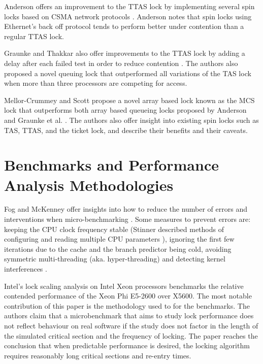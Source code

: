 Anderson offers an improvement to the TTAS lock by implementing several spin locks based on CSMA network protocols \cite{anderson1990performance}. Anderson notes that spin locks using Ethernet's back off protocol tends to perform better under contention than a regular TTAS lock.

Graunke and Thakkar also offer improvements to the TTAS lock by adding a delay after each failed test in order to reduce contention \cite{graunke1990synchronization}. The authors also proposed a novel queuing lock that outperformed all variations of the TAS lock when more than three processors are competing for access.

Mellor-Crummey and Scott propose a novel array based lock known as the MCS lock that outperforms both array based queueing locks proposed by Anderson and Graunke et al. \cite{mellor1991algorithms}. The authors also offer insight into existing spin locks such as TAS, TTAS, and the ticket lock, and describe their benefits and their caveats.

\section{Benchmarks and Performance Analysis Methodologies}
Fog and McKenney offer insights into how to reduce the number of errors and interventions when micro-benchmarking \cite{fog1996optimizing,fog2020optimizing, perfbook2021}. Some measures to prevent errors are: keeping the CPU clock frequency stable (Stinner described methods of configuring and reading multiple CPU parameters \cite{stinnerpstate}), ignoring the first few iterations due to the cache and the branch predictor being cold\cite{fog1996optimizing}, avoiding symmetric multi-threading (aka. hyper-threading) \cite{fog2020optimizing} and detecting kernel interferences \cite[Chapter~11.7]{perfbook2021}.

Intel's lock scaling analysis on Intel Xeon processors \cite{intelxeonlockscaling} benchmarks the relative contended performance of the Xeon Phi E5-2600 over X5600. The most notable contribution of this paper is the methodology used to for the benchmarks. The authors claim that a microbenchmark that aims to study lock performance does not reflect behaviour on real software if the study does not factor in the length of the simulated critical section and the frequency of locking. The paper reaches the conclusion that when predictable performance is desired, the locking algorithm requires reasonably long critical sections and re-entry times.

